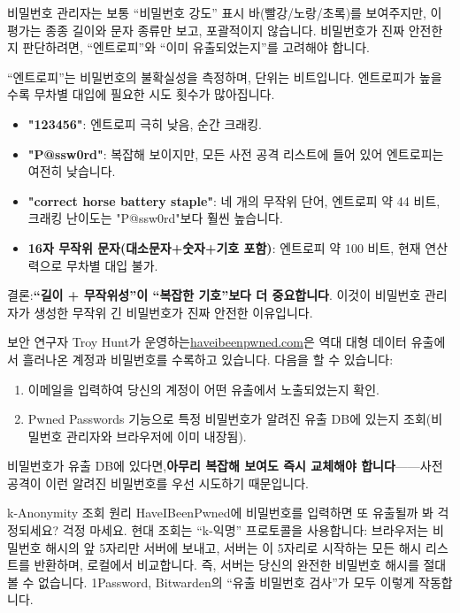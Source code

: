 
비밀번호 관리자는 보통 “비밀번호 강도” 표시 바(빨강/노랑/초록)를 보여주지만, 이 평가는 종종 길이와 문자 종류만 보고, 포괄적이지 않습니다. 비밀번호가 진짜 안전한지 판단하려면, “엔트로피”와 “이미 유출되었는지”를 고려해야 합니다.


“엔트로피”는 비밀번호의 불확실성을 측정하며, 단위는 비트입니다. 엔트로피가 높을수록 무차별 대입에 필요한 시도 횟수가 많아집니다.

\begin{itemize}
  \item \textbf{"123456"}: 엔트로피 극히 낮음, 순간 크래킹.
  \item \textbf{"P@ssw0rd"}: 복잡해 보이지만, 모든 사전 공격 리스트에 들어 있어 엔트로피는 여전히 낮습니다.
  \item \textbf{"correct horse battery staple"}: 네 개의 무작위 단어, 엔트로피 약 44 비트, 크래킹 난이도는 "P@ssw0rd"보다 훨씬 높습니다.
  \item \textbf{16자 무작위 문자(대소문자+숫자+기호 포함)}: 엔트로피 약 100 비트, 현재 연산력으로 무차별 대입 불가.
\end{itemize}

결론:\textbf{“길이 + 무작위성”이 “복잡한 기호”보다 더 중요합니다}. 이것이 비밀번호 관리자가 생성한 무작위 긴 비밀번호가 진짜 안전한 이유입니다.


보안 연구자 Troy Hunt가 운영하는\href{https://haveibeenpwned.com}{haveibeenpwned.com}은 역대 대형 데이터 유출에서 흘러나온 계정과 비밀번호를 수록하고 있습니다. 다음을 할 수 있습니다:

\begin{enumerate}
  \item 이메일을 입력하여 당신의 계정이 어떤 유출에서 노출되었는지 확인.
  \item Pwned Passwords 기능으로 특정 비밀번호가 알려진 유출 DB에 있는지 조회(비밀번호 관리자와 브라우저에 이미 내장됨).
\end{enumerate}

비밀번호가 유출 DB에 있다면,\textbf{아무리 복잡해 보여도 즉시 교체해야 합니다}——사전 공격이 이런 알려진 비밀번호를 우선 시도하기 때문입니다.

\begin{tcbinfo}{k-Anonymity 조회 원리}
HaveIBeenPwned에 비밀번호를 입력하면 또 유출될까 봐 걱정되세요? 걱정 마세요. 현대 조회는 “k-익명” 프로토콜을 사용합니다: 브라우저는 비밀번호 해시의 앞 5자리만 서버에 보내고, 서버는 이 5자리로 시작하는 모든 해시 리스트를 반환하며, 로컬에서 비교합니다. 즉, 서버는 당신의 완전한 비밀번호 해시를 절대 볼 수 없습니다. 1Password, Bitwarden의 “유출 비밀번호 검사”가 모두 이렇게 작동합니다.

\end{tcbinfo}

